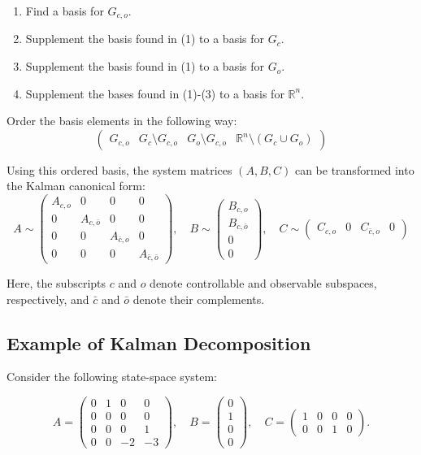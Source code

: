 \documentclass{article}
\begin{document}
\begin{enumerate}
    \item Find a basis for $G_{c,o}$.
    \item Supplement the basis found in (1) to a basis for $G_c$.
    \item Supplement the basis found in (1) to a basis for $G_o$.
    \item Supplement the bases found in (1)-(3) to a basis for $\mathbb{R}^n$.
\end{enumerate}

Order the basis elements in the following way:
\[
\begin{pmatrix}
G_{c,o} & G_c \setminus G_{c,o} & G_o \setminus G_{c,o} & \mathbb{R}^n \setminus (G_c \cup G_o)
\end{pmatrix}
\]

Using this ordered basis, the system matrices $(A, B, C)$ can be transformed into the Kalman canonical form:
\[
A \sim \begin{pmatrix}
A_{c,o} & 0 & 0 & 0 \\
0 & A_{c,\bar{o}} & 0 & 0 \\
0 & 0 & A_{\bar{c},o} & 0 \\
0 & 0 & 0 & A_{\bar{c},\bar{o}}
\end{pmatrix}, \quad
B \sim \begin{pmatrix}
B_{c,o} \\
B_{c,\bar{o}} \\
0 \\
0
\end{pmatrix}, \quad
C \sim \begin{pmatrix}
C_{c,o} & 0 & C_{\bar{c},o} & 0
\end{pmatrix}
\]

Here, the subscripts $c$ and $o$ denote controllable and observable subspaces, respectively, and $\bar{c}$ and $\bar{o}$ denote their complements.

\subsection{Example of Kalman Decomposition}

Consider the following state-space system:

\[
A = \begin{pmatrix}
0 & 1 & 0 & 0 \\
0 & 0 & 0 & 0 \\
0 & 0 & 0 & 1 \\
0 & 0 & -2 & -3
\end{pmatrix}, \quad
B = \begin{pmatrix}
0 \\
1 \\
0 \\
0
\end{pmatrix}, \quad
C = \begin{pmatrix}
1 & 0 & 0 & 0 \\
0 & 0 & 1 & 0
\end{pmatrix}.
\]
\end{document}
